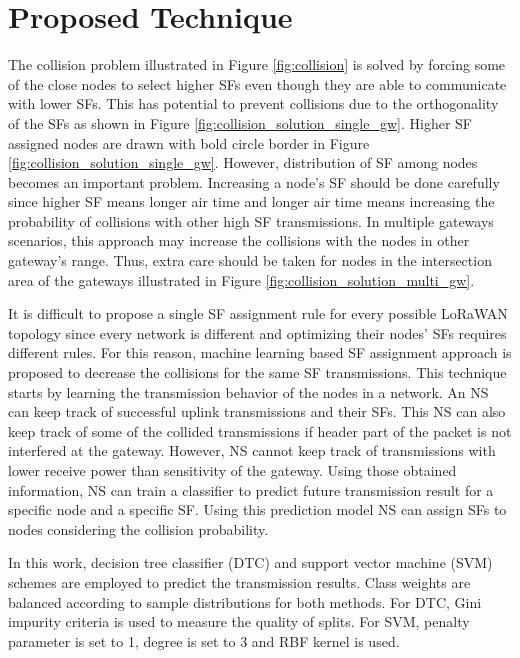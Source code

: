 \documentclass[conference]{IEEEtran}
\begin{document}
\section{Proposed Technique} \label{Proposed Technique}
The collision problem illustrated in Figure \ref{fig:collision} is solved by forcing some of the close nodes to select higher SFs even though they are able to communicate with lower SFs. This has potential to prevent collisions due to the orthogonality of the SFs as shown in Figure \ref{fig:collision_solution_single_gw}. Higher SF assigned nodes are drawn with bold circle border in Figure \ref{fig:collision_solution_single_gw}. However, distribution of SF among nodes becomes an important problem. Increasing a node's SF should be done carefully since higher SF means longer air time and longer air time means increasing the probability of collisions with other high SF transmissions. In multiple gateways scenarios, this approach may increase the collisions with the nodes in other gateway's range. Thus, extra care should be taken for nodes in the intersection area of the gateways illustrated in Figure \ref{fig:collision_solution_multi_gw}.

It is difficult to propose a single SF assignment rule for every possible LoRaWAN topology since every network is different and optimizing their nodes' SFs requires different rules. For this reason, machine learning based SF assignment approach is proposed to decrease the collisions for the same SF transmissions. This technique starts by learning the transmission behavior of the nodes in a network. An NS can keep track of successful uplink transmissions and their SFs. This NS can also keep track of some of the collided transmissions if header part of the packet is not interfered at the gateway. However, NS cannot keep track of transmissions with lower receive power than sensitivity of the gateway. Using those obtained information, NS can train a classifier to predict future transmission result for a specific node and a specific SF. Using this prediction model NS can assign SFs to nodes considering the collision probability.

In this work, decision tree classifier (DTC) and support vector machine (SVM) \cite{Alpaydin} schemes are employed to predict the transmission results. Class weights are balanced according to sample distributions for both methods. For DTC, Gini impurity criteria is used to measure the quality of splits. For SVM, penalty parameter is set to 1, degree is set to 3 and RBF kernel is used.
\end{document}
